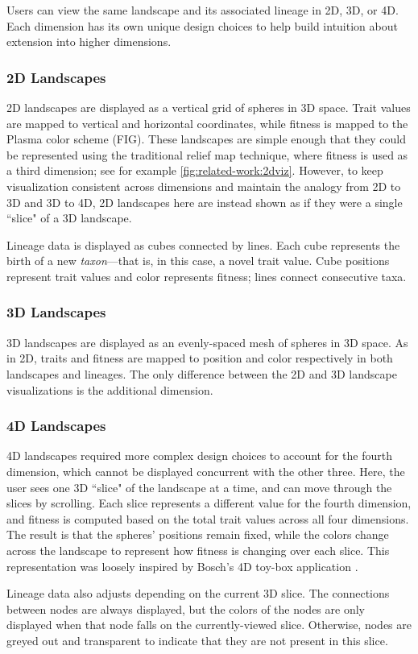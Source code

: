 Users can view the same landscape and its associated lineage in 2D, 3D, or 4D. Each dimension has its own unique design choices to help build intuition about extension into higher dimensions.

\subsubsection{2D Landscapes}

2D landscapes are displayed as a vertical grid of spheres in 3D space. Trait values are mapped to vertical and horizontal coordinates, while fitness is mapped to the Plasma color scheme (FIG). These landscapes are simple enough that they could be represented using the traditional relief map technique,  where fitness is used as a third dimension; see for example \autoref{fig:related-work:2dviz}. However, to keep visualization consistent across dimensions and maintain the analogy from 2D to 3D and 3D to 4D, 2D landscapes here are instead shown as if they were a single ``slice" of a 3D landscape. 

Lineage data is displayed as cubes connected by lines. Each cube represents the birth of a new \textit{taxon}---that is, in this case, a novel trait value. Cube positions represent trait values and color represents fitness; lines connect consecutive taxa. 

\subsubsection{3D Landscapes}

3D landscapes are displayed as an evenly-spaced mesh of spheres in 3D space. As in 2D, traits and fitness are mapped to position and color respectively in both landscapes and lineages. The only difference between the 2D and 3D landscape visualizations is the additional dimension.

\subsubsection{4D Landscapes}

4D landscapes required more complex design choices to account for the fourth dimension, which cannot be displayed concurrent with the other three. Here, the user sees one 3D ``slice" of the landscape at a time, and can move through the slices by scrolling. Each slice represents a different value for the fourth dimension, and fitness is computed based on the total trait values across all four dimensions. The result is that the spheres' positions remain fixed, while the colors change across the landscape to represent how fitness is changing over each slice. This representation was loosely inspired by Bosch's 4D toy-box application \citep{bosch_n_2020}.

Lineage data also adjusts depending on the current 3D slice. The connections between nodes are always displayed, but the colors of the nodes are only displayed when that node falls on the currently-viewed slice. Otherwise, nodes are greyed out and transparent to indicate that they are not present in this slice.